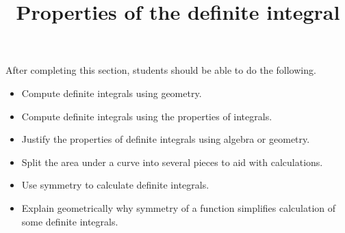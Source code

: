 \documentclass{ximera}
\title{Properties of the definite integral}
\begin{document}
\begin{abstract}
\end{abstract}

\maketitle

\begin{sectionOutcomes}

After completing this section, students should be able to do the following.

\begin{itemize}
	\item Compute definite integrals using geometry.
	\item Compute definite integrals using the properties of integrals.
	\item Justify the properties of definite integrals using algebra or geometry.
	\item Split the area under a curve into several pieces to aid with calculations.
	\item Use symmetry to calculate definite integrals.
	\item Explain geometrically why symmetry of a function simplifies calculation of some definite integrals.
\end{itemize}

\end{sectionOutcomes}
\end{document}
